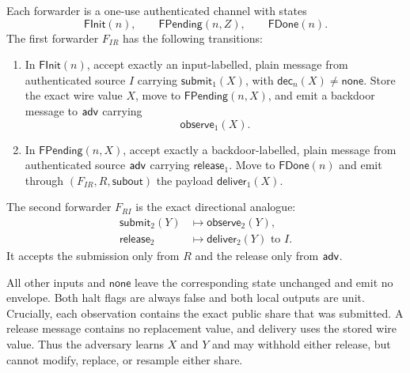 \begin{definition}
\label{def:dhke-forwarder-programs}
\notready
Each forwarder is a one-use authenticated channel with states
\[
  \mathsf{FInit}(n),
  \qquad
  \mathsf{FPending}(n,Z),
  \qquad
  \mathsf{FDone}(n).
\]
The first forwarder \(F_{IR}\) has the following transitions:
\begin{enumerate}
\item In \(\mathsf{FInit}(n)\), accept exactly an input-labelled, plain
      message from authenticated source \(I\) carrying
      \(\mathsf{submit}_1(X)\), with \(\mathsf{dec}_n(X)\ne\mathsf{none}\).
      Store the exact wire value \(X\), move to
      \(\mathsf{FPending}(n,X)\), and emit a backdoor message to \(\mathsf{adv}\)
      carrying
      \[
        \mathsf{observe}_1(X).
      \]
\item In \(\mathsf{FPending}(n,X)\), accept exactly a backdoor-labelled,
      plain message from authenticated source \(\mathsf{adv}\) carrying
      \(\mathsf{release}_1\).  Move to \(\mathsf{FDone}(n)\) and emit through
      \((F_{IR},R,\mathsf{subout})\) the payload
      \(\mathsf{deliver}_1(X)\).
\end{enumerate}
The second forwarder \(F_{RI}\) is the exact directional analogue:
\[
\begin{aligned}
  \mathsf{submit}_2(Y)
  &\longmapsto \mathsf{observe}_2(Y),\\
  \mathsf{release}_2
  &\longmapsto \mathsf{deliver}_2(Y)\text{ to }I.
\end{aligned}
\]
It accepts the submission only from \(R\) and the release only from \(\mathsf{adv}\).

All other inputs and \(\mathsf{none}\) leave the corresponding state unchanged
and emit no envelope.  Both halt flags are always false and both local outputs
are unit.  Crucially, each observation contains the exact public share that was
submitted.  A release message contains no replacement value, and delivery uses
the stored wire value.  Thus the adversary learns \(X\) and \(Y\) and may
withhold either release, but cannot modify, replace, or resample either share.
\end{definition}

